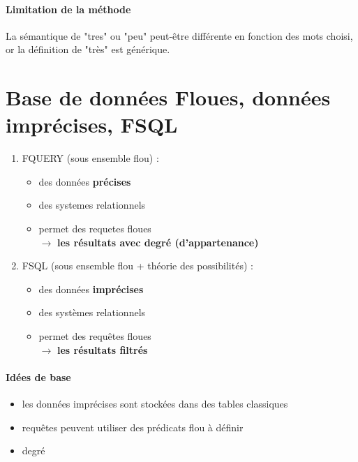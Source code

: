 \documentclass[a4paper,11pt]{article}
\begin{document}
\subsection{Limitation de la méthode}
La sémantique de "tres" ou "peu" peut-être différente en fonction des mots choisi, or la définition de "très" est générique.

\part{Base de données Floues, données imprécises, FSQL}

\begin{enumerate}
\item FQUERY (sous ensemble flou) : \\
	\begin{itemize}
	\item des données \textbf{précises}
	\item des systemes relationnels
	\item permet des requetes floues\\
	$\longrightarrow$ \textbf{les résultats avec degré (d'appartenance)}
\end{itemize}

\item FSQL (sous ensemble flou + théorie des possibilités) : \\
	\begin{itemize}
	\item des données \textbf{imprécises}
	\item des systèmes relationnels
	\item permet des requêtes floues\\
	$\longrightarrow$ \textbf{les résultats filtrés}
\end{itemize}

\end{enumerate}

\subsection{Idées de base}
\begin{itemize}
	\item les données imprécises sont stockées dans des tables classiques
	\item requêtes peuvent utiliser des prédicats flou à définir
	\item degré
\end{itemize}
\end{document}
